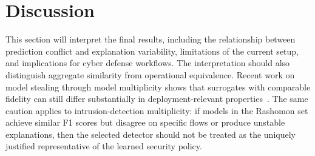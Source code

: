 \section{Discussion}

This section will interpret the final results, including the relationship between prediction conflict and explanation variability, limitations of the current setup, and implications for cyber defense workflows. The interpretation should also distinguish aggregate similarity from operational equivalence. Recent work on model stealing through model multiplicity shows that surrogates with comparable fidelity can still differ substantially in deployment-relevant properties~\cite{baltz2026model}. The same caution applies to intrusion-detection multiplicity: if models in the Rashomon set achieve similar F1 scores but disagree on specific flows or produce unstable explanations, then the selected detector should not be treated as the uniquely justified representative of the learned security policy.

